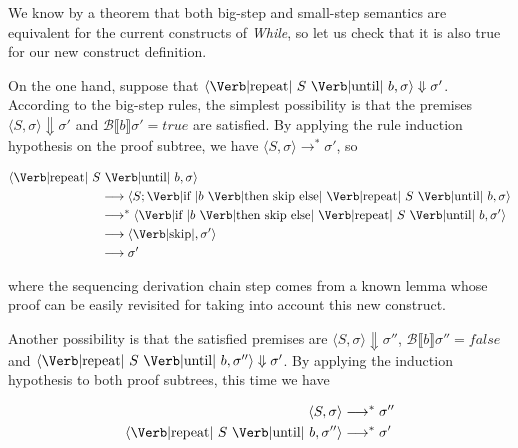 \documentclass{article}
\begin{document}
\begin{enumerate}[2.]
    We know by a theorem that both big-step and small-step
    semantics are equivalent for the current constructs of 
    \textit{While}, so let us check that it is also true for our 
    new construct definition.

    On the one hand, suppose that 
    $
      \langle 
        \text{\Verb|repeat| } S \text{ \Verb|until| } b,
        \sigma
      \rangle \Downarrow \sigma'
    $. According to the big-step rules, the simplest possibility 
    is that the premises 
    $\langle S, \sigma \rangle \Downarrow \sigma'$ and
    $\mathcal{B}\llbracket b \rrbracket \sigma' = true$ are 
    satisfied. 
    By applying the rule induction hypothesis on the proof subtree, 
    we have 
    $\langle S, \sigma \rangle \longrightarrow^{*} \sigma'$, so

    \begin{align*}
      \langle
        \text{\Verb|repeat| } S &\text{ \Verb|until| } b,
        \sigma
      \rangle \\&\longrightarrow
      \langle
        S;
        \text{\Verb|if |} b \text{ \Verb|then skip else| } 
        \text{\Verb|repeat| } S \text{ \Verb|until| } b,
        \sigma
      \rangle \\&\longrightarrow^{*}
      \langle 
        \text{\Verb|if |} b \text{ \Verb|then skip else| } 
        \text{\Verb|repeat| } S \text{ \Verb|until| } b,
        \sigma'
      \rangle \\&\longrightarrow
      \langle 
        \text{\Verb|skip|},
        \sigma'
      \rangle \\&\longrightarrow
      \sigma'
    \end{align*}

    where the sequencing derivation chain step comes from a 
    known lemma whose proof can be easily revisited for taking 
    into account this new construct.

    Another possibility is that the satisfied premises are 
    $\langle S, \sigma \rangle \Downarrow \sigma''$,
    $\mathcal{B} \llbracket b \rrbracket \sigma'' = false$ and 
    $
      \langle 
        \text{\Verb|repeat| } S \text{ \Verb|until| } b,
        \sigma''
      \rangle \Downarrow \sigma'
    $. By applying the induction hypothesis to both proof
    subtrees, this time we have

    \begin{align*}
    \langle S, \sigma \rangle &\longrightarrow^{*} \sigma'' \\
    \langle 
      \text{\Verb|repeat| } S \text{ \Verb|until| } b,
      \sigma''
    \rangle &\longrightarrow^{*} \sigma'
    \end{align*}


\end{enumerate}
\end{document}
